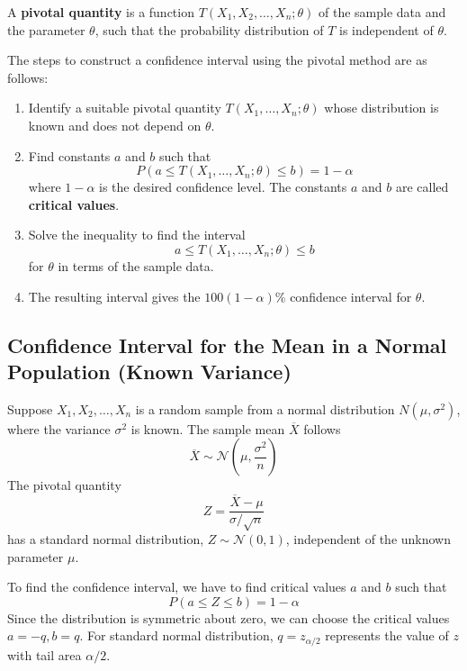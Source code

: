 \documentclass[twoside]{book}
\begin{document}
\begin{textbox}
A \textbf{pivotal quantity} is a function $T(X_1, X_2, \dots, X_n; \theta)$ of the sample data and the parameter $\theta$, such that the probability distribution of $T$ is independent of $\theta$.
\end{textbox}


\medskip

The steps to construct a confidence interval using the pivotal method are as follows:

\begin{enumerate}
    \item Identify a suitable pivotal quantity $T(X_1, \dots, X_n; \theta)$ whose distribution is known and does not depend on $\theta$.
    \item Find constants $a$ and $b$ such that
    \[
    P(a \leq T(X_1, \dots, X_n; \theta) \leq b) = 1 - \alpha
    \]
    where $1-\alpha$ is the desired confidence level. The constants $a$ and $b$ are called \textbf{critical values}.
    \item Solve the inequality to find the interval
    \[
    a \leq T(X_1, \dots, X_n; \theta) \leq b
    \]
    for $\theta$ in terms of the sample data.
    \item The resulting interval gives the $100(1-\alpha)\%$ confidence interval for $\theta$.
\end{enumerate}

\bigskip

\subsection{Confidence Interval for the Mean in a Normal Population (Known Variance)}

Suppose $X_1, X_2, \dots, X_n$ is a random sample from a normal distribution $N(\mu, \sigma^2)$, where the variance $\sigma^2$ is known. The sample mean $\overline{X}$ follows
\[
\overline{X} \sim \mathcal{N}\left(\mu, \frac{\sigma^2}{n}\right)
\]
The pivotal quantity
\[
Z = \frac{\overline{X} - \mu}{\sigma / \sqrt{n}}
\]
has a standard normal distribution, $Z \sim \mathcal{N}(0,1)$, independent of the unknown parameter $\mu$.

To find the confidence interval, we have to find critical values $a$ and $b$ such that
$$P\left(a \leq Z \leq b\right) = 1 - \alpha$$
Since the distribution is symmetric about zero, we can choose the critical values $a = -q, b = q$. For standard normal distribution, $q = z_{\alpha/2}$ represents the value of $z$ with tail area $\alpha/2$.
\end{document}
